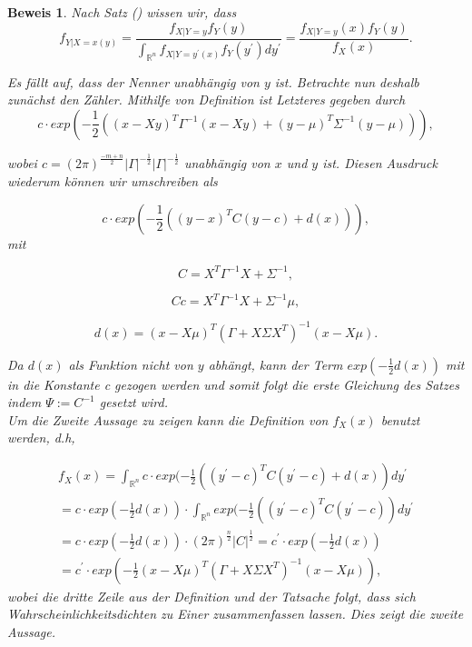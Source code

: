 \documentclass[12pt,a4paper]{scrartcl}
\newtheorem{Beweis}{Beweis}
\numberwithin{equation}{section}
\newcommand{\R}{\mathbb{R}} %
\begin{document}
\begin{Beweis}
 Nach Satz () wissen wir, dass 
$$
  f_{Y|X=x(y)} = \frac{f_{X|Y=y}f_{Y}(y)}{\int_{\R^n}f_{X|Y=y^{'}(x)}f_{Y}(y^{'})dy^{'}} 
 = \frac{f_{X|Y=y}(x)f_{Y}(y)}{f_{X}(x)}.
$$

 Es fällt auf, dass der Nenner unabhängig von $y$ ist. Betrachte nun deshalb zunächst den Zähler.
 Mithilfe von Definition ist Letzteres gegeben durch 
 $$ 
 c\cdot exp(-\frac{1}{2}((x-Xy)^{T}\Gamma^{-1}(x-Xy)+(y-\mu)^{T}\varSigma^{-1}(y-\mu))),
 $$

 
 wobei $c = (2\pi)^{\frac{-m+n}{2}}|\Gamma|^{-\frac{1}{2}}|\Gamma|^{-\frac{1}{2}}$ unabhängig von 
 $x$ und $y$ ist.
 Diesen Ausdruck wiederum können wir umschreiben als 
 
 $$
 c \cdot exp(-\frac{1}{2}((y-x)^{T}C(y-c)+d(x))), 
 $$
 mit 
 
 $$
 C = X^{T}\Gamma^{-1}X+\varSigma^{-1},
 $$
 
 $$
 Cc = X^{T}\Gamma^{-1}X+\varSigma^{-1}\mu,
 $$
 
 $$
 d(x) = (x-X\mu)^{T}(\Gamma+X\varSigma X^{T})^{-1}(x-X\mu).
 $$
 
 Da $d(x)$ als Funktion nicht von $y$ abhängt, kann der Term $exp(-\frac{1}{2}d(x))$ mit in die
 Konstante c gezogen werden und somit folgt die erste Gleichung des Satzes indem $\Psi:=C^{-1}$
 gesetzt wird.\\
 Um die Zweite Aussage zu zeigen kann die Definition von $f_{X}(x)$ benutzt werden, d.h,
 
 $$
 \begin{array}{c}
  f_{X}(x) = \int_{\R^{n}}c \cdot exp(-\frac{1}{2}((y^{'}-c)^{T}C(y^{'}-c)+d(x))dy^{'} \\
 = c \cdot exp(-\frac{1}{2}d(x)) \cdot \int_{\R^{n}}exp(-\frac{1}{2}((y^{'}-c)^{T}C(y^{'}-c))dy^{'}\\
 = c \cdot exp(-\frac{1}{2}d(x)) \cdot (2\pi)^{\frac{n}{2}}|C|^\frac{1}{2} = c^{'} \cdot exp(-\frac{1}{2}d(x))\\
 = c^{'} \cdot exp(-\frac{1}{2}(x-X\mu)^{T}(\Gamma+X\varSigma X^T)^{-1}(x-X\mu)),
 \end{array}
 $$
 wobei die dritte Zeile aus der Definition und der Tatsache folgt, dass sich Wahrscheinlichkeitsdichten
 zu Einer zusammenfassen lassen. Dies zeigt die zweite Aussage. 
\end{Beweis}


 \newpage  %
\end{document}
